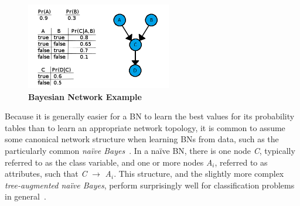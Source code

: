 \documentclass[conference]{IEEEtran}
\begin{document}
\begin{figure}[t]
	\centering
	\includegraphics[height=1.5in, width=2.5in]{BayesianNetwork.png}
	\caption{\bf Bayesian Network Example}
	\label{Fig:BayesianNet}
	\vspace{-0.25in}
\end{figure}

Because it is generally easier for a BN to learn the best values for its probability tables than to learn an appropriate network topology, it is common to assume some canonical network structure when learning BNs from data, such as the particularly common \emph{na\"{i}ve Bayes}~\cite{Darwiche:10}. In a na\"{i}ve BN, there is one node \emph{C}, typically referred to as the class variable, and one or more nodes \emph{A$_{i}$}, referred to as attributes, such that \emph{C} $\rightarrow$ \emph{A$_{i}$}. This structure, and the slightly more complex \emph{tree-augmented na\"{i}ve Bayes}, perform surprisingly well for classification problems in general~\cite{Friedman:97}\cite{Quinlan:93}.

\end{document}
